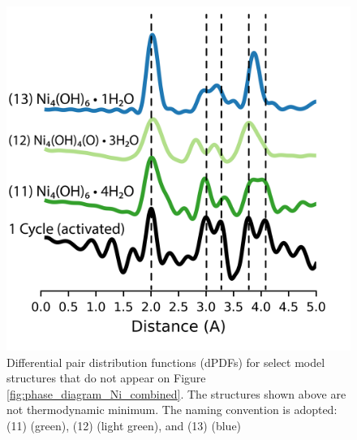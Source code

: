 \documentclass[journal=jctcce,manuscript=article]{achemso}
\begin{document}


\begin{figure}
    \centering
    \includegraphics{zi-images/01-Ni-Graphics/2021-03-03-Ni-special-selection-dPDFs-manuscript.png}
    \caption{
    Differential pair distribution functions (dPDFs) for select model structures that do not appear on Figure \ref{fig:phase_diagram_Ni_combined}. The structures shown above are not thermodynamic minimum. The naming convention is adopted: (11)  (green), (12)  (light green), and (13)  (blue)
    }
    \label{fig:dPDF-Ni-special}
\end{figure}
\end{document}
